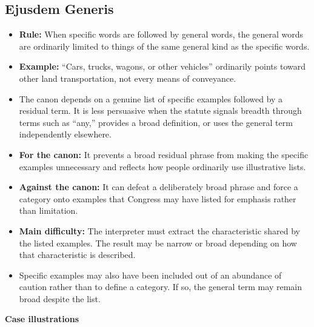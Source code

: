 \documentclass[11pt]{tex/lawoutline}
\begin{document}
\subsection{Ejusdem Generis}

\begin{itemize}
    \item \textbf{Rule:} When specific words are followed by general words, the general words are ordinarily limited to things of the same general kind as the specific words.
    \item \textbf{Example:} ``Cars, trucks, wagons, or other vehicles'' ordinarily points toward other land transportation, not every means of conveyance.
    \item The canon depends on a genuine list of specific examples followed by a residual term. It is less persuasive when the statute signals breadth through terms such as ``any,'' provides a broad definition, or uses the general term independently elsewhere.
    \item \textbf{For the canon:} It prevents a broad residual phrase from making the specific examples unnecessary and reflects how people ordinarily use illustrative lists.
    \item \textbf{Against the canon:} It can defeat a deliberately broad phrase and force a category onto examples that Congress may have listed for emphasis rather than limitation.
    \item \textbf{Main difficulty:} The interpreter must extract the characteristic shared by the listed examples. The result may be narrow or broad depending on how that characteristic is described.
    \item Specific examples may also have been included out of an abundance of caution rather than to define a category. If so, the general term may remain broad despite the list.
\end{itemize}

\textbf{Case illustrations}
\end{document}
